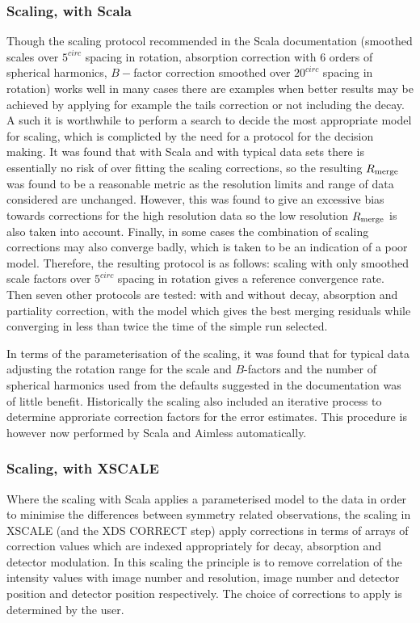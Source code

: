 \documentclass[a4paper,11pt]{article}
\begin{document}
\subsubsection{Scaling, with Scala}

Though the scaling protocol recommended in the Scala documentation
(smoothed scales over $5^{circ}$ spacing in rotation, absorption
correction with 6 orders of spherical harmonics, $B-$factor correction
smoothed over $20^{circ}$ spacing in rotation) works well in many
cases there are examples when better results may be achieved by
applying for example the tails correction or not including the
decay. A such it is worthwhile to perform a search to decide the most
appropriate model for scaling, which is complicted by the need for a
protocol for the decision making. It was found that with Scala and
with typical data sets there is essentially no risk of over fitting
the scaling corrections, so the resulting $R_{\rm{merge}}$ was found to
be a reasonable metric as the resolution limits and range of data
considered are unchanged. However, this was found to give an excessive
bias towards corrections for the high resolution data so the low
resolution $R_{\rm{merge}}$ is also taken into account. Finally, in
some cases the combination of scaling corrections may also converge
badly, which is taken to be an indication of a poor model. Therefore,
the resulting protocol is as follows: scaling with only smoothed scale
factors over $5^{circ}$ spacing in rotation gives a reference
convergence rate. Then seven other protocols are tested: with and
without decay, absorption and partiality correction, with the model
which gives the best merging residuals while converging in less than
twice the time of the simple run selected. 

In terms of the parameterisation of the scaling, it was found that for
typical data adjusting the rotation range for the scale and
$B$-factors and the number of spherical harmonics used from the
defaults suggested in the documentation was of little benefit.
Historically the scaling also included an iterative process to
determine approriate correction factors for the error estimates. This
procedure is however now performed by Scala and Aimless automatically.

\subsubsection{Scaling, with XSCALE}

Where the scaling with Scala applies a parameterised model to the data
in order to minimise the differences between symmetry related
observations, the scaling in XSCALE (and the XDS CORRECT step) apply
corrections in terms of arrays of correction values which are indexed
appropriately for decay, absorption and detector modulation. In this
scaling the principle is to remove correlation of the intensity values
with image number and resolution, image number and detector position
and detector position respectively. The choice of corrections to apply
is determined by the user.
\end{document}
